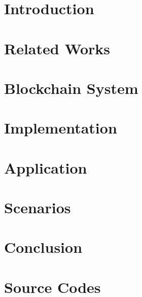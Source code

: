 \documentclass[12pt,twoside,openright]{report}
\makeatletter
\def\cleardoublepage{\clearpage\if@twoside \ifodd\c@page\else
    \hbox{}
    \thispagestyle{empty}
    \newpage
    \if@twocolumn\hbox{}\newpage\fi\fi\fi}
\makeatother
\begin{document}

\cleardoublepage


\cleardoublepage


\cleardoublepage


\cleardoublepage

\tableofcontents

\listoffigures
 
\listoftables

\begin{spacing}{1.5}
\listofalgorithms
{}

\renewcommand\lstlistlistingname{List of Configuration Files}
\lstlistoflistings
{}
\end{spacing}

\chapter{Introduction}


\chapter{Related Works}


\chapter{Blockchain System}


\chapter{Implementation}


\chapter{Application}


\chapter{Scenarios}


\chapter{Conclusion}





\appendix
\chapter{Source Codes}

\end{document}
